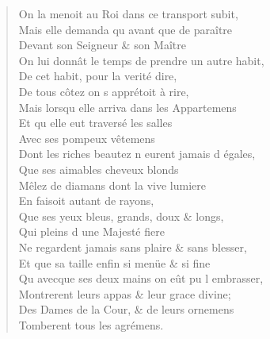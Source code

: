 \begin{verse}
On la menoit au Roi dans ce transport subit, \\
Mais elle demanda qu\textquotesingle{} avant que de paraître \\
\vin Devant son Seigneur \& son Maître \\
On lui donnât le temps de prendre un autre habit, \\
\vin De cet habit, pour la verité dire, \\
\vin De tous côtez on s\textquotesingle{} apprétoit à rire, \\
Mais lorsqu\textquotesingle{} elle arriva dans les Appartemens \\
\vin Et qu\textquotesingle{} elle eut traversé les salles \\
\vin Avec ses pompeux vêtemens \\
Dont les riches beautez n\textquotesingle{} eurent jamais d\textquotesingle{} égales, \\
\vin Que ses aimables cheveux blonds \\
Mêlez de diamans dont la vive lumiere \\
\vin En faisoit autant de rayons, \\
\vin Que ses yeux bleus, grands, doux \& longs, \\
\vin Qui pleins d\textquotesingle{} une Majesté fiere \\
Ne regardent jamais sans plaire \& sans blesser, \\
Et que sa taille enfin si menüe \& si fine \\
Qu\textquotesingle{} avecque ses deux mains on eût pu l\textquotesingle{} embrasser, \\
Montrerent leurs appas \& leur grace divine; \\
Des Dames de la Cour, \& de leurs ornemens \\
\vin Tomberent tous les agrémens.


\end{verse}
